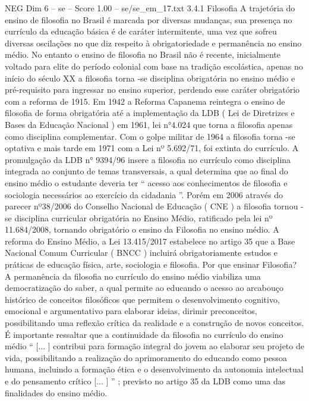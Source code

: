 \begin{textsample}{NEG Dim 6 – se – Score 1.00 – se/se\_em\_17.txt}  \label{ex:f6_neg_243}
3.4.1 Filosofia A trajetória do ensino de filosofia no Brasil é marcada por diversas mudanças, sua presença no currículo da educação básica é de caráter intermitente, uma vez que sofreu diversas oscilações no que diz respeito à obrigatoriedade e permanência no ensino médio.
No entanto o ensino de filosofia no Brasil não é recente, inicialmente voltado para elite do período colonial com base na tradição escolástica, apenas no início do século XX a filosofia torna -se disciplina obrigatória no ensino médio e pré-requisito para ingressar no ensino superior, perdendo esse caráter obrigatório com a reforma de 1915.
Em 1942 a Reforma Capanema reintegra o ensino de filosofia de forma obrigatória até a implementação da LDB ( Lei de Diretrizes e Bases da Educação Nacional ) em 1961, lei n{\EmojiFont °}4.024 que torna a filosofia apenas como disciplina complementar.
Com o golpe militar de 1964 a filosofia torna -se optativa e mais tarde em 1971 com a Lei nº 5.692/71, foi extinta do currículo.
A promulgação da LDB n{\EmojiFont °} 9394/96 insere a filosofia no currículo como disciplina integrada ao conjunto de temas transversais, a qual determina que ao final do ensino médio o estudante deveria ter “ acesso aos conhecimentos de filosofia e sociologia necessários ao exercício da cidadania ”.
Porém em 2006 através do parecer nº38/2006 do Conselho Nacional de Educação ( CNE ) a filosofia tornou -se disciplina curricular obrigatória no Ensino Médio, ratificado pela lei nº 11.684/2008, tornando obrigatório o ensino da Filosofia no ensino médio.
A reforma do Ensino Médio, a Lei 13.415/2017 estabelece no artigo 35 que a Base Nacional Comum Curricular ( BNCC ) incluirá obrigatoriamente estudos e práticas de educação física, arte, sociologia e filosofia.
Por que ensinar Filosofia?
A permanência da filosofia no currículo do ensino médio viabiliza uma democratização do saber, a qual permite ao educando o acesso ao arcabouço histórico de conceitos filosóficos que permitem o desenvolvimento cognitivo, emocional e argumentativo para elaborar ideias, dirimir preconceitos, possibilitando uma reflexão crítica da realidade e a construção de novos conceitos.
É importante ressaltar que a continuidade da filosofia no currículo do ensino médio “ [... ] contribui para formação integral do jovem ao elaborar seu projeto de vida, possibilitando a realização do aprimoramento do educando como pessoa humana, incluindo a formação ética e o desenvolvimento da autonomia intelectual e do pensamento crítico [... ] ” ; previsto no artigo 35 da LDB como uma das finalidades do ensino médio.

\end{textsample}
